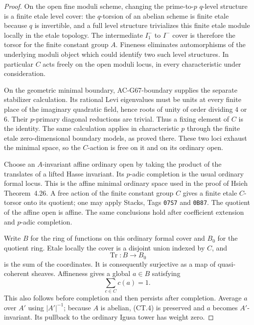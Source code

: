 \begin{proof}
On the open fine moduli scheme, changing the prime-to-$p$
$q$-level structure is a finite etale level cover: the
$q$-torsion of an abelian scheme is finite etale because $q$
is invertible, and a full level structure trivializes this
finite etale module locally in the etale topology.  The
intermediate $I_1^-$ to $I^-$ cover is therefore the torsor
for the finite constant group $A$.  Fineness eliminates
automorphisms of the underlying moduli object which could
identify two such level structures.  In particular $C$ acts
freely on the open moduli locus, in every characteristic
under consideration.

On the geometric minimal boundary, AC-G67-boundary supplies
the separate stabilizer calculation.  Its rational Levi
eigenvalues must be units at every finite place of the
imaginary quadratic field, hence roots of unity of order
dividing $4$ or $6$.  Their $p$-primary diagonal reductions
are trivial.  Thus a fixing element of $C$ is the identity.
The same calculation applies in characteristic $p$ through
the finite etale zero-dimensional boundary models, as proved
there.  These two loci exhaust the minimal space, so the
$C$-action is free on it and on its ordinary open.

Choose an $A$-invariant affine ordinary open by taking the
product of the translates of a lifted Hasse invariant.  Its
$p$-adic completion is the usual ordinary formal locus.
This is the affine minimal ordinary space used in the proof
of Hsieh Theorem~4.26.  A free action of the finite constant
group $C$ gives a finite etale $C$-torsor onto its quotient;
one may apply Stacks, Tags \texttt{07S7} and \texttt{0B87}.
The quotient of the affine open is affine.  The same
conclusions hold after coefficient extension and $p$-adic
completion.

Write $B$ for the ring of functions on this ordinary formal
cover and $B_0$ for the quotient ring.  Etale locally the
cover is a disjoint union indexed by $C$, and
\[
                   \operatorname{Tr}:B\longrightarrow B_0
\]
is the sum of the coordinates.  It is consequently
surjective as a map of quasi-coherent sheaves.  Affineness
gives a global $a\in B$ satisfying
\[
                       \sum_{c\in C}c(a)=1.              \tag{CT.4}
\]
This also follows before completion and then persists after
completion.  Average $a$ over $A'$ using $|A'|^{-1}$; because
$A$ is abelian, (CT.4) is preserved and $a$ becomes
$A'$-invariant.  Its pullback to the ordinary Igusa tower has
weight zero.


\end{proof}
